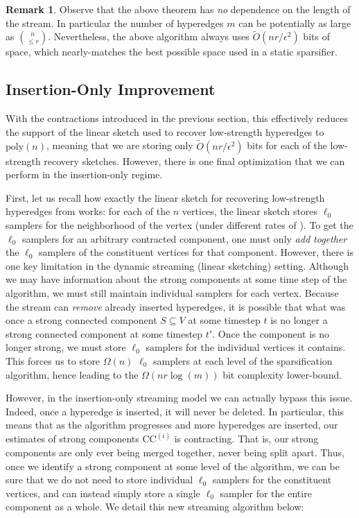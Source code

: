 \documentclass[11pt]{article}
\theoremstyle{definition}
\newtheorem{remark}[theorem]{Remark}
\newcommand{\eps}{\epsilon}
\begin{document}
\begin{remark}
	Observe that the above theorem has \emph{no} dependence on the length of the stream. In particular the number of hyperedges $m$ can be potentially as large as $\binom{n}{\leq r}$. Nevertheless, the above algorithm always uses $\widetilde{O}(n r / \eps^2)$ bits of space, which nearly-matches the best possible space used in a static sparsifier. 
\end{remark}

\subsection{Insertion-Only Improvement}

With the  contractions introduced in the previous section, this effectively reduces the support of the linear sketch used to recover low-strength hyperedges to $\mathrm{poly}(n)$, meaning that we are storing only $\widetilde{O}(n r / \eps^2)$ bits for each of the low-strength recovery sketches. However, there is one final optimization that we can perform in the insertion-only regime. 

First, let us recall how exactly the linear sketch for recovering low-strength hyperedges from \cite{KPS24d} works: for each of the $n$ vertices, the linear sketch stores $\ell_0$ samplers for the neighborhood of the vertex (under different rates of ). To get the $\ell_0$ samplers for an arbitrary contracted component, one must only \emph{add together} the $\ell_0$ samplers of the constituent vertices for that component. However, there is one key limitation in the dynamic streaming (linear sketching) setting. Although we may have information about the strong components at some time step of the algorithm, we must still maintain individual samplers for each vertex. Because the stream can \emph{remove} already inserted hyperedges, it is possible that what was once a strong connected component $S \subseteq V$ at some timestep $t$ is no longer a strong connected component at some timestep $t'$. Once the component is no longer strong, we must store $\ell_0$ samplers for the individual vertices it contains. This forces us to store $\Omega(n)$ $\ell_0$ samplers at each level of the sparsification algorithm, hence leading to the $\Omega(nr\log(m))$ bit complexity lower-bound. 

However, in the insertion-only streaming model we can actually bypass this issue. Indeed, once a hyperedge is inserted, it will never be deleted. In particular, this means that as the algorithm progresses and more hyperedges are inserted, our estimates of strong components $\mathrm{CC}^{(i)}$ is  contracting. That is, our strong components are only ever being merged together, never being split apart. Thus, once we identify a strong component at some level of the algorithm, we can be sure that we do not need to store individual $\ell_0$ samplers for the constituent vertices, and can instead simply store a single $\ell_0$ sampler for the entire component as a whole. We detail this new streaming algorithm below:
\end{document}
